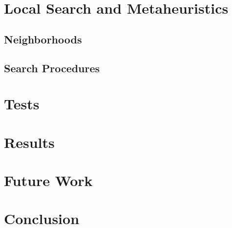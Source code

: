 \documentclass[a4paper,11pt]{article}
\begin{document}
\section{Local Search and Metaheuristics} \label{sec_local}
  
  \subsection{Neighborhoods}
  
  \subsection{Search Procedures}
  
\section{Tests}
\section{Results}
\section{Future Work}
  
\section{Conclusion}
\end{document}
